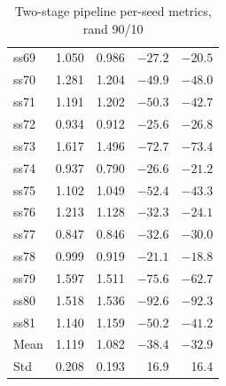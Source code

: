 \begin{table}[htbp]
{\begin{tabular}{lrrrr}
ss69 & 1.050 & 0.986 & $-27.2$ & $-20.5$ \\
ss70 & 1.281 & 1.204 & $-49.9$ & $-48.0$ \\
ss71 & 1.191 & 1.202 & $-50.3$ & $-42.7$ \\
ss72 & 0.934 & 0.912 & $-25.6$ & $-26.8$ \\
ss73 & 1.617 & 1.496 & $-72.7$ & $-73.4$ \\
ss74 & 0.937 & 0.790 & $-26.6$ & $-21.2$ \\
ss75 & 1.102 & 1.049 & $-52.4$ & $-43.3$ \\
ss76 & 1.213 & 1.128 & $-32.3$ & $-24.1$ \\
ss77 & 0.847 & 0.846 & $-32.6$ & $-30.0$ \\
ss78 & 0.999 & 0.919 & $-21.1$ & $-18.8$ \\
ss79 & 1.597 & 1.511 & $-75.6$ & $-62.7$ \\
ss80 & 1.518 & 1.536 & $-92.6$ & $-92.3$ \\
ss81 & 1.140 & 1.159 & $-50.2$ & $-41.2$ \\
\midrule
Mean & 1.119 & 1.082 & $-38.4$ & $-32.9$ \\
Std  & 0.208 & 0.193 & 16.9    & 16.4    \\
\bottomrule
\end{tabular}}
\caption{Two-stage pipeline per-seed metrics, rand 90/10}
\label{tab:per_seed_two_stage}
\end{table}

